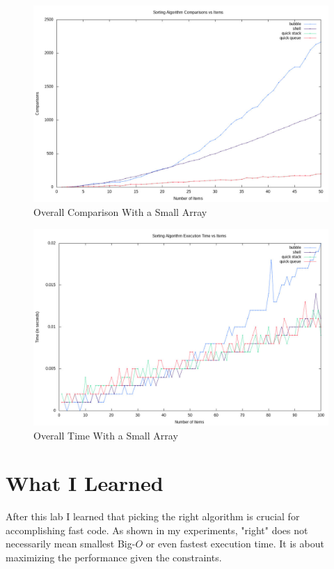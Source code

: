 \documentclass[12pt]{article}
\begin{document}
	\begin{figure}[H]
		\caption{Overall Comparison With a Small Array}\label{comparison_small}
		\includegraphics[width=6in]{comparison_small}
		\centering
	\end{figure}

	\begin{figure}[H]
		\caption{Overall Time With a Small Array}\label{time}
		\includegraphics[width=6in]{comparison_time}
		\centering
	\end{figure}


	\section{What I Learned}

	After this lab I learned that picking the right algorithm is crucial for accomplishing fast code.
	As shown in my experiments, "right" does not necessarily mean smallest Big-$O$ or even fastest execution time.
	It is about maximizing the performance given the constraints.

	
\end{document}
